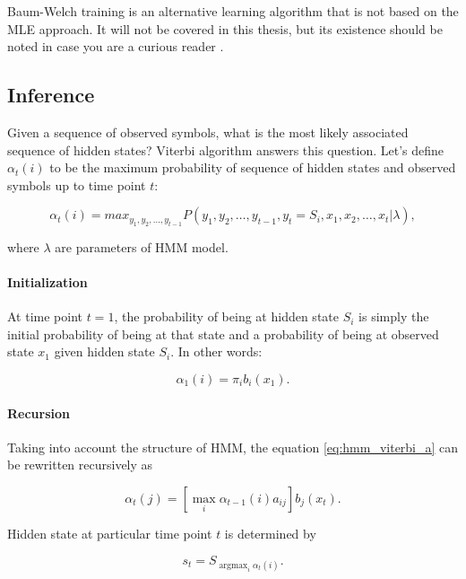 \documentclass[thesis=B,english]{FITthesis}[2012/06/26]
\DeclareMathOperator*{\argmax}{argmax} %
\begin{document}
Baum-Welch training is an alternative learning algorithm that is not based on the MLE approach. It will not be covered in this thesis, but its existence should be noted in case you are a curious reader \cite{hmm-lawrence}.

\subsection{Inference}

Given a sequence of observed symbols, what is the most likely associated sequence of hidden states? Viterbi algorithm answers this question. Let's define $\alpha_t(i)$ to be the maximum probability of sequence of hidden states and observed symbols up to time point $t$:

\begin{equation} \label{eq:hmm_viterbi_a}
\alpha_t(i) = max_{y_1,y_2,\dots,y_{t-1}} P(y_1,y_2,\dots,y_{t-1},y_t = S_i,x_1,x_2,\dots,x_t | \lambda),
\end{equation}

where $\lambda$ are parameters of HMM model.

\paragraph{Initialization}

At time point $t=1$, the probability of being at hidden state $S_i$ is simply the initial probability of being at that state and a probability of being at observed state $x_1$ given hidden state $S_i$. In other words:

\begin{equation*}
\alpha_1(i) = \pi_i b_i(x_1).
\end{equation*}

\paragraph{Recursion}
Taking into account the structure of HMM, the equation \ref{eq:hmm_viterbi_a} can be rewritten recursively as

\begin{equation} \label{eq:hmm_viterbi_a_rec}
\alpha_t(j) = [\max_i \alpha_{t-1}(i)a_{ij}] b_j(x_t).
\end{equation}

Hidden state at particular time point $t$ is determined by

\begin{equation*}
s_t = S_{\argmax_i \alpha_{t}(i)}.
\end{equation*}
\end{document}
